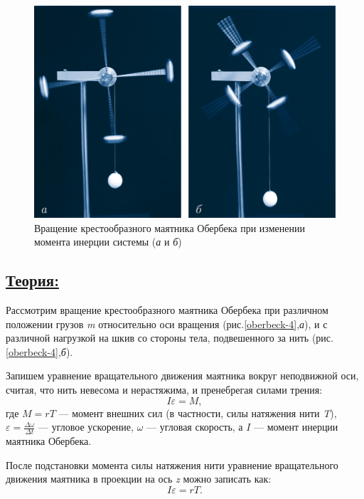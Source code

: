 \documentclass[14pt,a4paper,oneside]{extarticle}	%
\begin{document}
	\begin{figure}[H] 	
		\centering 	
		\includegraphics[width=0.8\linewidth]{oberbeck-3.png}
		\caption{Вращение крестообразного маятника Обербека при изменении момента инерции системы (\textit{а} и \textit{б})}
		\label{oberbeck-3}
	\end{figure}
	
	\subsection*{\underline{Теория:}}
	
Рассмотрим вращение крестообразного маятника Обербека при различном положении грузов \textit{m} относительно оси вращения (рис.\ref{oberbeck-4},\textit{а}), и с различной нагрузкой на шкив со стороны тела, подвешенного за нить (рис.\ref{oberbeck-4},\textit{б}). 
	
Запишем уравнение вращательного движения маятника вокруг неподвижной оси, считая, что нить невесома и нерастяжима, и пренебрегая силами трения:
\begin{equation}\label{oberbeck-eq1}
	I\varepsilon = M,
\end{equation}
где $ M=rT $ — момент внешних сил (в частности, силы натяжения нити \textit{T}), $ \varepsilon = \frac{\Delta\omega}{\Delta t} $ — угловое ускорение, $ \omega $ — угловая скорость, а $ I $ — момент инерции маятника Обербека.


	После подстановки момента силы натяжения нити уравнение вращательного движения маятника в проекции на ось \textit{z} можно записать как:
	\begin{equation}\label{oberbeck-eq2}
	I\varepsilon = rT. 
	\end{equation}
\end{document}
